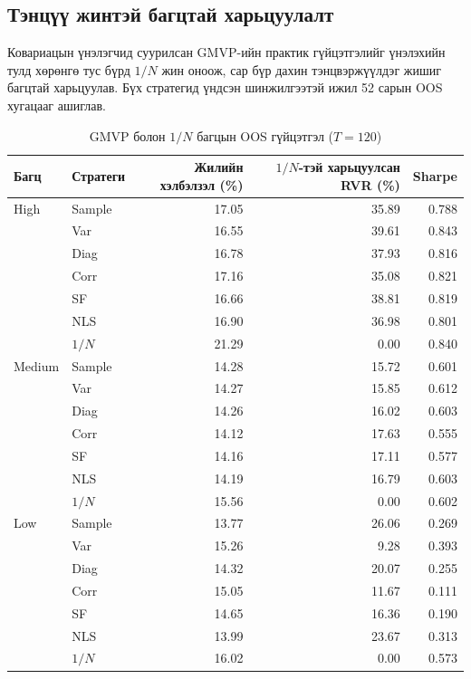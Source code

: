 \subsection{Тэнцүү жинтэй багцтай харьцуулалт}
\label{subsec:equal_weight_results}

Ковариацын үнэлэгчид суурилсан GMVP-ийн
практик гүйцэтгэлийг үнэлэхийн тулд
хөрөнгө тус бүрд $1/N$ жин оноож,
сар бүр дахин тэнцвэржүүлдэг жишиг
багцтай харьцуулав. Бүх стратегид
үндсэн шинжилгээтэй ижил 52 сарын
OOS хугацааг ашиглав.

\begin{table}[htbp]
	\centering
	\caption{GMVP болон $1/N$ багцын OOS гүйцэтгэл ($T=120$)}
	\label{tab:equal_weight_comparison}
	\small
	\begin{tabular}{llrrr}
		\hline
		Багц & Стратеги &
		Жилийн хэлбэлзэл (\%) &
		$1/N$-тэй харьцуулсан RVR (\%) &
		Sharpe \\
		\hline
		High & Sample & 17.05 & 35.89 & 0.788 \\
		& Var & 16.55 & 39.61 & 0.843 \\
		& Diag & 16.78 & 37.93 & 0.816 \\
		& Corr & 17.16 & 35.08 & 0.821 \\
		& SF & 16.66 & 38.81 & 0.819 \\
		& NLS & 16.90 & 36.98 & 0.801 \\
		& $1/N$ & 21.29 & 0.00 & 0.840 \\
		\hline
		Medium & Sample & 14.28 & 15.72 & 0.601 \\
		& Var & 14.27 & 15.85 & 0.612 \\
		& Diag & 14.26 & 16.02 & 0.603 \\
		& Corr & 14.12 & 17.63 & 0.555 \\
		& SF & 14.16 & 17.11 & 0.577 \\
		& NLS & 14.19 & 16.79 & 0.603 \\
		& $1/N$ & 15.56 & 0.00 & 0.602 \\
		\hline
		Low & Sample & 13.77 & 26.06 & 0.269 \\
		& Var & 15.26 & 9.28 & 0.393 \\
		& Diag & 14.32 & 20.07 & 0.255 \\
		& Corr & 15.05 & 11.67 & 0.111 \\
		& SF & 14.65 & 16.36 & 0.190 \\
		& NLS & 13.99 & 23.67 & 0.313 \\
		& $1/N$ & 16.02 & 0.00 & 0.573 \\
		\hline
	\end{tabular}
\end{table}

